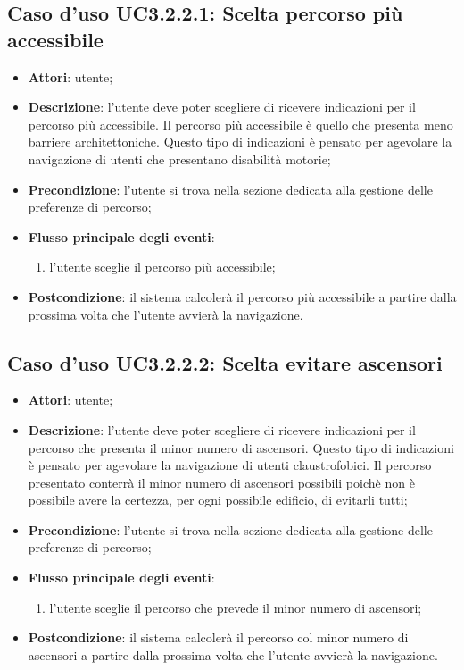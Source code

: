 \documentclass[../AnalisiDeiRequisiti.tex]{subfiles}
\begin{document}
\subsection{Caso d'uso UC3.2.2.1: Scelta percorso più accessibile}
\begin{itemize}
\item \textbf{Attori}: utente;
\item \textbf{Descrizione}: l'utente deve poter scegliere di ricevere indicazioni per il percorso più accessibile. Il percorso più accessibile è quello che presenta meno barriere architettoniche. Questo tipo di indicazioni è pensato per agevolare la navigazione di utenti che presentano disabilità motorie; 
      \item \textbf{Precondizione}: l'utente si trova nella sezione dedicata alla gestione delle preferenze di percorso;

        \item \textbf{Flusso principale degli eventi}:
          \begin{enumerate}
          \item l'utente sceglie il percorso più accessibile;

      \end{enumerate}
    \item \textbf{Postcondizione}: il sistema calcolerà il percorso più accessibile a partire dalla prossima volta che l'utente avvierà la navigazione.
  \end{itemize}
\hypertarget{UC3.2.2.2}{}
\subsection{Caso d'uso UC3.2.2.2: Scelta evitare ascensori}
\begin{itemize}
\item \textbf{Attori}: utente;
\item \textbf{Descrizione}: l'utente deve poter scegliere di ricevere indicazioni per il percorso che presenta il minor numero di ascensori. Questo tipo di indicazioni è pensato per agevolare la navigazione di utenti claustrofobici. Il percorso presentato conterrà il minor numero di ascensori possibili poichè non è possibile avere la certezza, per ogni possibile edificio, di evitarli tutti; 
      \item \textbf{Precondizione}: l'utente si trova nella sezione dedicata alla gestione delle preferenze di percorso;

        \item \textbf{Flusso principale degli eventi}:
          \begin{enumerate}
          \item l'utente sceglie il percorso che prevede il minor numero di ascensori;

      \end{enumerate}
    \item \textbf{Postcondizione}: il sistema calcolerà il percorso col minor numero di ascensori a partire dalla prossima volta che l'utente avvierà la navigazione.
  \end{itemize}
\hypertarget{UC4}{}
\end{document}
